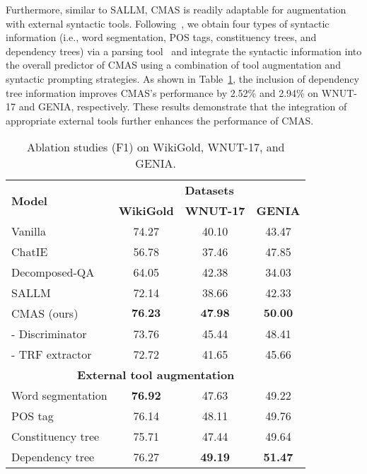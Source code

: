 Furthermore, similar to SALLM, \ac{CMAS} is readily adaptable for augmentation with external syntactic tools. Following~\citet{DBLP:conf/emnlp/XieLZZLW23}, we obtain four types of syntactic information (i.e., word segmentation, POS tags, constituency trees, and dependency trees) via a parsing tool~\citep{DBLP:conf/emnlp/HeC21} and integrate the syntactic information into the overall predictor of \ac{CMAS} using a combination of tool augmentation and syntactic prompting strategies. As shown in Table~\ref{tab:ablation studies-chapter5}, the inclusion of dependency tree information improves \ac{CMAS}'s performance by 2.52\% and 2.94\% on WNUT-17 and GENIA, respectively. These results demonstrate that the integration of appropriate external tools further enhances the performance of \ac{CMAS}.


\begin{table}[ht]
  \centering
  \setlength\tabcolsep{3pt}
  \caption{Ablation studies (F1) on WikiGold, WNUT-17, and GENIA. }
  \label{tab:ablation studies-chapter5}
  \begin{tabular}{l ccc}
    \toprule
  \multirow{2}{*}{\bf Model} & \multicolumn{3}{c}{\bf Datasets}\\
    \cmidrule(r){2-4}
    & \bf WikiGold & \bf WNUT-17 & \bf GENIA  \\
  \midrule
    Vanilla~\citep{DBLP:conf/emnlp/XieLZZLW23,DBLP:journals/corr/abs-2311-08921}  & 74.27  & 40.10 & 43.47   \\
    ChatIE~\citep{wei2023zero}  & 56.78  & 37.46
 & 47.85    \\
    Decomposed-QA~\citep{DBLP:conf/emnlp/XieLZZLW23}  & 64.05  & 42.38
 & 34.03    \\

 SALLM~\citep{DBLP:conf/emnlp/XieLZZLW23} & 72.14 & 38.66 & 42.33   \\
 \midrule
    CMAS (ours) & $\textbf{76.23}$ & $\textbf{47.98}$ & $\textbf{50.00}$\\ 
          \quad - Discriminator& 73.76 & 45.44 & 48.41  \\
     \quad - TRF extractor& 72.72 & 41.65 & 45.66  \\
     \midrule
     \multicolumn{4}{c}{\bf External tool augmentation} \\
     \midrule
     Word segmentation & \textbf{76.92} & 47.63 & 49.22 \\
     POS tag & 76.14 & 48.11 & 49.76\\
     Constituency tree & 75.71 & 47.44 & 49.64\\
     Dependency tree & 76.27 & \textbf{49.19} & \textbf{51.47}\\
  \bottomrule
\end{tabular}
\end{table}

